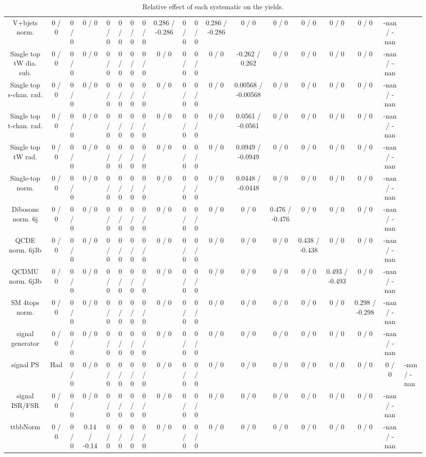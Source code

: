 \documentclass[10pt]{article}
\begin{document}
\begin{table}[htbp]
\begin{center}
\begin{tabular}{|c|c|c|c|c|c|c|c|c|c|c|c|c|c|c|c|c|c|}
  V+bjets norm. & 0 / 0 & 0 / 0 & 0 / 0 & 0 / 0 & 0 / 0 & 0 / 0 & 0 / 0 & 0.286 / -0.286 & 0 / 0 & 0 / 0 & 0.286 / -0.286 & 0 / 0 & 0 / 0 & 0 / 0 & 0 / 0 & 0 / 0 & -nan / -nan \\ 
  Single top tW dia. sub. & 0 / 0 & 0 / 0 & 0 / 0 & 0 / 0 & 0 / 0 & 0 / 0 & 0 / 0 & 0 / 0 & 0 / 0 & 0 / 0 & 0 / 0 & -0.262 / 0.262 & 0 / 0 & 0 / 0 & 0 / 0 & 0 / 0 & -nan / -nan \\ 
  Single top s-chan. rad. & 0 / 0 & 0 / 0 & 0 / 0 & 0 / 0 & 0 / 0 & 0 / 0 & 0 / 0 & 0 / 0 & 0 / 0 & 0 / 0 & 0 / 0 & 0.00568 / -0.00568 & 0 / 0 & 0 / 0 & 0 / 0 & 0 / 0 & -nan / -nan \\ 
  Single top t-chan. rad. & 0 / 0 & 0 / 0 & 0 / 0 & 0 / 0 & 0 / 0 & 0 / 0 & 0 / 0 & 0 / 0 & 0 / 0 & 0 / 0 & 0 / 0 & 0.0561 / -0.0561 & 0 / 0 & 0 / 0 & 0 / 0 & 0 / 0 & -nan / -nan \\ 
  Single top tW rad. & 0 / 0 & 0 / 0 & 0 / 0 & 0 / 0 & 0 / 0 & 0 / 0 & 0 / 0 & 0 / 0 & 0 / 0 & 0 / 0 & 0 / 0 & 0.0949 / -0.0949 & 0 / 0 & 0 / 0 & 0 / 0 & 0 / 0 & -nan / -nan \\ 
  Single-top norm. & 0 / 0 & 0 / 0 & 0 / 0 & 0 / 0 & 0 / 0 & 0 / 0 & 0 / 0 & 0 / 0 & 0 / 0 & 0 / 0 & 0 / 0 & 0.0448 / -0.0448 & 0 / 0 & 0 / 0 & 0 / 0 & 0 / 0 & -nan / -nan \\ 
  Dibosons norm. 6j & 0 / 0 & 0 / 0 & 0 / 0 & 0 / 0 & 0 / 0 & 0 / 0 & 0 / 0 & 0 / 0 & 0 / 0 & 0 / 0 & 0 / 0 & 0 / 0 & 0.476 / -0.476 & 0 / 0 & 0 / 0 & 0 / 0 & -nan / -nan \\ 
  QCDE norm. 6j3b & 0 / 0 & 0 / 0 & 0 / 0 & 0 / 0 & 0 / 0 & 0 / 0 & 0 / 0 & 0 / 0 & 0 / 0 & 0 / 0 & 0 / 0 & 0 / 0 & 0 / 0 & 0.438 / -0.438 & 0 / 0 & 0 / 0 & -nan / -nan \\ 
  QCDMU norm. 6j3b & 0 / 0 & 0 / 0 & 0 / 0 & 0 / 0 & 0 / 0 & 0 / 0 & 0 / 0 & 0 / 0 & 0 / 0 & 0 / 0 & 0 / 0 & 0 / 0 & 0 / 0 & 0 / 0 & 0.493 / -0.493 & 0 / 0 & -nan / -nan \\ 
  SM 4tops norm. & 0 / 0 & 0 / 0 & 0 / 0 & 0 / 0 & 0 / 0 & 0 / 0 & 0 / 0 & 0 / 0 & 0 / 0 & 0 / 0 & 0 / 0 & 0 / 0 & 0 / 0 & 0 / 0 & 0 / 0 & 0.298 / -0.298 & -nan / -nan \\ 
  signal generator & 0 / 0 & 0 / 0 & 0 / 0 & 0 / 0 & 0 / 0 & 0 / 0 & 0 / 0 & 0 / 0 & 0 / 0 & 0 / 0 & 0 / 0 & 0 / 0 & 0 / 0 & 0 / 0 & 0 / 0 & 0 / 0 & -nan / -nan \\ 
  signal PS & Had & 0 / 0 & 0 / 0 & 0 / 0 & 0 / 0 & 0 / 0 & 0 / 0 & 0 / 0 & 0 / 0 & 0 / 0 & 0 / 0 & 0 / 0 & 0 / 0 & 0 / 0 & 0 / 0 & 0 / 0 & 0 / 0 & -nan / -nan \\ 
  signal ISR/FSR & 0 / 0 & 0 / 0 & 0 / 0 & 0 / 0 & 0 / 0 & 0 / 0 & 0 / 0 & 0 / 0 & 0 / 0 & 0 / 0 & 0 / 0 & 0 / 0 & 0 / 0 & 0 / 0 & 0 / 0 & 0 / 0 & -nan / -nan \\ 
 ttbbNorm & 0 / 0 & 0 / 0 & 0.14 / -0.14 & 0 / 0 & 0 / 0 & 0 / 0 & 0 / 0 & 0 / 0 & 0 / 0 & 0 / 0 & 0 / 0 & 0 / 0 & 0 / 0 & 0 / 0 & 0 / 0 & 0 / 0 & -nan / -nan \\ 
\hline 
\end{tabular} 
\caption{Relative effect of each systematic on the yields.} 
\end{center} 
\end{table} 
\end{document}
